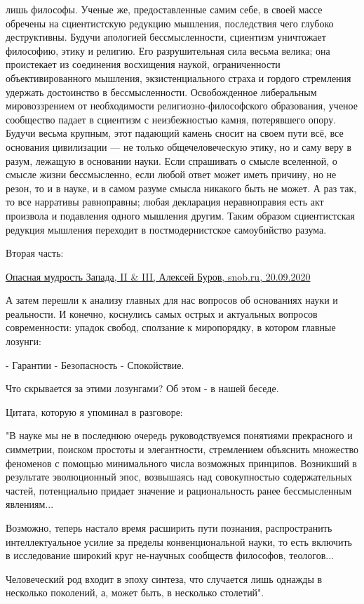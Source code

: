 \begin{multicols}{3}
лишь философы. Ученые же, предоставленные самим себе, в своей массе обречены на
сциентистскую редукцию мышления, последствия чего глубоко деструктивны. Будучи
апологией бессмысленности, сциентизм уничтожает философию, этику и религию. Его
разрушительная сила весьма велика; она проистекает из соединения восхищения
наукой, ограниченности объективированного мышления, экзистенциального страха и
гордого стремления удержать достоинство в бессмысленности. Освобожденное
либеральным мировоззрением от необходимости религиозно-философского
образования, ученое сообщество падает в сциентизм с неизбежностью камня,
потерявшего опору. Будучи весьма крупным, этот падающий камень сносит на своем
пути всё, все основания цивилизации — не только общечеловеческую этику, но и
саму веру в разум, лежащую в основании науки. Если спрашивать о смысле
вселенной, о смысле жизни бессмысленно, если любой ответ может иметь причину,
но не резон, то и в науке, и в самом разуме смысла никакого быть не может. А
раз так, то все нарративы равноправны; любая декларация неравноправия есть акт
произвола и подавления одного мышления другим. Таким образом сциентистская
редукция мышления переходит в постмодернистское самоубийство разума. 

\end{multicols}

Вторая часть: 

\href{https://snob.ru/profile/27355/blog/170283}{%
Опасная мудрость Запада, II \& III, Алексей Буров, snob.ru, 20.09.2020%
}

\begin{multicols}{3}
\end{multicols}

А затем перешли к анализу главных для нас вопросов об основаниях  науки и
реальности. И конечно, коснулись самых острых и актуальных вопросов
современности: упадок свобод, сползание к миропорядку, в котором главные
лозунги:

\obeycr
- Гарантии
- Безопасность
- Спокойствие.
\restorecr

Что скрывается за этими лозунгами? Об этом - в нашей беседе.  

Цитата, которую я упоминал в разговоре: 

\begin{zznagolos}
"В науке мы не в последнюю очередь руководствуемся понятиями прекрасного и
симметрии, поиском простоты и элегантности, стремлением объяснить множество
феноменов с помощью минимального числа возможных принципов. Возникший в
результате эволюционный эпос, возвышаясь над совокупностью содержательных
частей, потенциально придает значение и рациональность ранее бессмысленным
явлениям... 

Возможно, теперь настало время расширить пути познания, распространить
интеллектуальное усилие за пределы конвенциональной науки, то есть
включить в исследование широкий круг не-научных сообществ философов,
теологов... 

Человеческий род входит в эпоху синтеза, что случается лишь однажды в несколько
поколений, а, может быть, в несколько столетий". 
\end{zznagolos}

